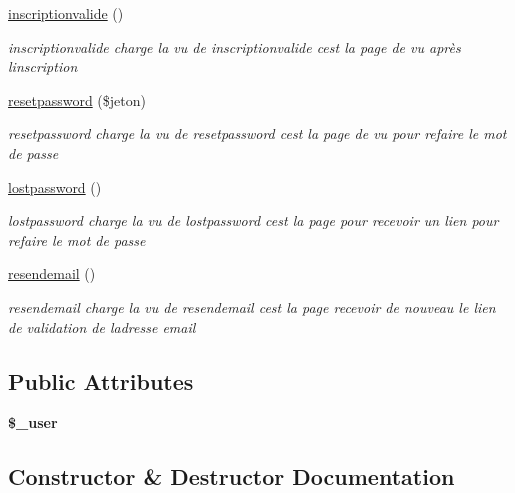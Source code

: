\begin{DoxyCompactItemize}
\mbox{\hyperlink{classusers_model_a88fadcc257de04e5445083d722b44428}{inscriptionvalide}} ()
\begin{DoxyCompactList}\small\item\em inscriptionvalide charge la vu de inscriptionvalide c\textquotesingle{}est la page de vu après l\textquotesingle{}inscription \end{DoxyCompactList}\item 
\mbox{\hyperlink{classusers_model_a0a9b6a319a05c1210cd6a4d535b5a659}{resetpassword}} (\$jeton)
\begin{DoxyCompactList}\small\item\em resetpassword charge la vu de resetpassword c\textquotesingle{}est la page de vu pour refaire le mot de passe \end{DoxyCompactList}\item 
\mbox{\hyperlink{classusers_model_a1946ca112e0c07969fa2b46566899e22}{lostpassword}} ()
\begin{DoxyCompactList}\small\item\em lostpassword charge la vu de lostpassword c\textquotesingle{}est la page pour recevoir un lien pour refaire le mot de passe \end{DoxyCompactList}\item 
\mbox{\hyperlink{classusers_model_ad1f92d2e00bad5dd71aa5e56f5f49487}{resendemail}} ()
\begin{DoxyCompactList}\small\item\em resendemail charge la vu de resendemail c\textquotesingle{}est la page recevoir de nouveau le lien de validation de l\textquotesingle{}adresse email \end{DoxyCompactList}\end{DoxyCompactItemize}
\subsection*{Public Attributes}
\begin{DoxyCompactItemize}
\item 
\mbox{\label{classusers_model_a47b78896630480396f40b47531c72fd2}} 
{\bfseries \$\+\_\+user}
\end{DoxyCompactItemize}


\subsection{Constructor \& Destructor Documentation}
\mbox{\label{classusers_model_abb86d91f199111023f62b2d884cf100d}} 
